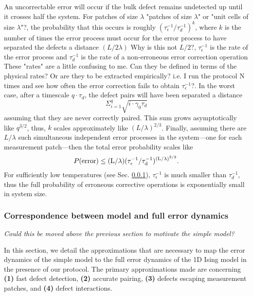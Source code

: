 \documentclass[twocolumn,superscriptaddress,aps,prb,floatfix]{revtex4-1}
\newcommand{\CMH}[1]{{\color{green} { #1}}}
\newcommand{\MS}[1]{{\color{mauve} {#1}}}
\begin{document}
 An uncorrectable error will occur if the bulk defect remains undetected up until it crosses half the system.  For patches of size $\lambda$ \MS{"patches of size $\lambda$" or "unit cells of size $\lambda$"?}, the probability that this occurs is roughly $(\tau_{\epsilon}^{-1} / \tau_d^{-1})^{k}$, where $k$ is the number of times the error process must occur for the error process to have separated the defects a distance $(L/2\lambda)$ \MS{Why is this not $L/2$?}, $\tau_{\epsilon}^{-1}$ is the rate of the error process and $\tau_d^{-1}$ is the rate of a non-erroneous error correction operation \MS{These "rates" are a little confusing to me. Can they be defined in terms of the physical rates? Or are they to be extracted empirically? i.e. I run the protocol N times and see how often the error correction fails to obtain $\tau_{\epsilon}^{-1}$?}.  In the worst case, after a timescale $q\cdot\tau_{d}$, the defect pairs will have been separated a distance 
\begin{equation}  
\Sigma^q_{i=1} \sqrt{i \cdot \gamma_0 \tau_{d}}
\end{equation}
 assuming that they are never correctly paired.  This sum grows asymptotically like $q^{3/2}$, thus, $k$ scales approximately like $(L/\lambda)^{2/3}$.
Finally, assuming there are $L/\lambda$ such simultaneous independent error processes in the system---one for each measurement patch---then the total error probability scales like
\begin{align}
\label{eq:err_scaling}
 P(\rm{error})\leq (L/\lambda) (\tau_{\epsilon}^{-1} / \tau_d^{-1})^{(L/\lambda)^{2/3}}.
\end{align}
For sufficiently low temperatures (see Sec. \ref{sec:correspondence}), $\tau_{\epsilon}^{-1}$ is much smaller than $\tau_d^{-1}$, thus the full probability of erroneous corrective operations is exponentially small in system size.

 \subsubsection{Correspondence between model and full error dynamics}
 \label{sec:correspondence}
 
 \CMH{\it{Could this be moved above the previous section to motivate the simple model?}}
 
 In this section, we detail the approximations that are necessary to map the error dynamics of the simple model to the full error dynamics of the 1D Ising model in the presence of our protocol.  The primary approximations made are concerning \textbf{(1)} fast defect detection, \textbf{(2)} accurate pairing, \textbf{(3)} defects escaping measurement patches, and \textbf{(4)} defect interactions.
 
\end{document}
